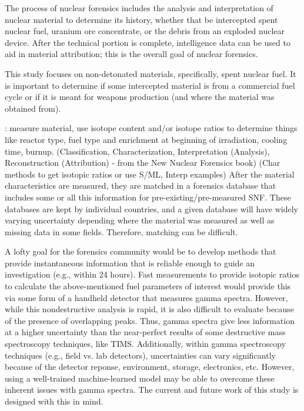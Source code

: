 The process of nuclear forensics includes the analysis and interpretation of
nuclear material to determine its history, whether that be intercepted spent
nuclear fuel, uranium ore concentrate, or the debris from an exploded nuclear
device. After the technical portion is complete, intelligence data can be used
to aid in material attribution; this is the overall goal of nuclear forensics. 

This study focuses on non-detonated materials, specifically, spent nuclear
fuel. It is important to determine if some intercepted material is from a
commercial fuel cycle or if it is meant for weapons production (and where the
material was obtained from). 

: measure material, use
isotope content and/or isotope ratios to determine things like reactor type,
fuel type and enrichment at beginning of irradiation, cooling time, burnup.
(Classification, Characterization, Interpretation (Analysis), Reconstruction
(Attribution) - from the New Nuclear Forensics book) (Char methods to get
isotopic ratios or use S/ML, Interp examples) After the material
characteristics are measured, they are matched in a forensics database that
includes some or all this information for pre-existing/pre-measured SNF. These
databases are kept by individual countries, and a given database will have
widely varying uncertainty depending where the material was measured as well as
missing data in some fields.  Therefore, matching can be difficult.

A lofty goal for the forensics community would be to develop methods that
provide instantaneous information that is reliable enough to guide an
investigation (e.g., within 24 hours). Fast measurements to provide isotopic
ratios to calculate the above-mentioned fuel parameters of interest would
provide this via some form of a handheld detector that measures gamma spectra.
However, while this nondestructive analysis is rapid, it is also difficult to
evaluate because of the presence of overlapping peaks.  Thus, gamma spectra
give less information at a higher uncertainty than the near-perfect results of
some destructive mass spectroscopy techniques, like TIMS.  Additionally, within gamma spectroscopy techniques (e.g., field
vs. lab detectors), uncertainties can vary significantly because of the
detector reponse, environment, storage, electronics, etc.  However, using a
well-trained machine-learned model may be able to overcome these inherent
issues with gamma spectra. The current and future work of this study is
designed with this in mind. 
